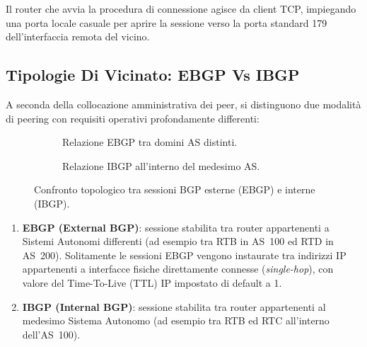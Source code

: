 \documentclass[11pt, a4paper]{article}
\begin{document}

Il router che avvia la procedura di connessione agisce da client TCP, impiegando una porta locale casuale per aprire la sessione verso la porta standard 179 dell'interfaccia remota del vicino.

\subsection{Tipologie Di Vicinato: EBGP Vs IBGP}

A seconda della collocazione amministrativa dei peer, si distinguono due modalità di peering con requisiti operativi profondamente differenti:

\begin{figure}[H]
    \centering
    \begin{subfigure}[b]{0.48\textwidth}
        \centering
        \caption{Relazione EBGP tra domini AS distinti.}
    \end{subfigure}
    \hfill
    \begin{subfigure}[b]{0.48\textwidth}
        \centering
        \caption{Relazione IBGP all'interno del medesimo AS.}
    \end{subfigure}
    \caption{Confronto topologico tra sessioni BGP esterne (EBGP) e interne (IBGP).}
\end{figure}

\begin{enumerate}
    \item \textbf{EBGP (External BGP)}: sessione stabilita tra router appartenenti a Sistemi Autonomi differenti (ad esempio tra RTB in AS~100 ed RTD in AS~200). Solitamente le sessioni EBGP vengono instaurate tra indirizzi IP appartenenti a interfacce fisiche direttamente connesse (\emph{single-hop}), con valore del Time-To-Live (TTL) IP impostato di default a 1.
    \item \textbf{IBGP (Internal BGP)}: sessione stabilita tra router appartenenti al medesimo Sistema Autonomo (ad esempio tra RTB ed RTC all'interno dell'AS~100).
\end{enumerate}
\end{document}

